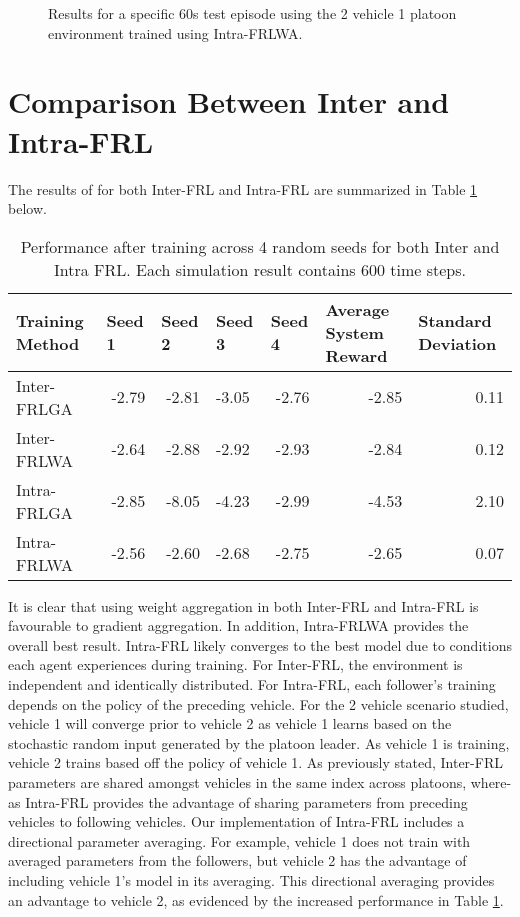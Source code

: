 \begin{figure}[H]
    \centering
    
    \caption{Results for a specific 60s test episode using the 2 vehicle 1 platoon environment trained using Intra-FRLWA.}
    \label{fig:intraFRL-simresult}
\end{figure}

\section{Comparison Between Inter and Intra-FRL}
The results of for both Inter-FRL and Intra-FRL are summarized in Table \ref{tab:inter_vs_intra} below.

\begin{table}[H]
    \centering
    \scriptsize
    \caption{Performance after training across 4 random seeds for both Inter and Intra FRL. Each simulation result contains 600 time steps.}
    \begin{tabular}{lrrlrrr} \toprule
    \textbf{Training Method} & \multicolumn{1}{l}{\textbf{Seed 1}} & \multicolumn{1}{l}{\textbf{Seed 2}} & \multicolumn{1}{l}{\textbf{Seed 3}} & \multicolumn{1}{l}{\textbf{Seed 4}} & \multicolumn{1}{l}{\textbf{Average System Reward}} & \multicolumn{1}{l}{\textbf{Standard Deviation}} \\ \midrule
        Inter-FRLGA & -2.79 & -2.81 & -3.05 & -2.76 & -2.85 & 0.11 \\
        Inter-FRLWA & -2.64 & -2.88 & -2.92 & -2.93 & -2.84 & 0.12 \\
        Intra-FRLGA & -2.85 & -8.05 & -4.23 & -2.99 & -4.53 & 2.10 \\
        Intra-FRLWA & -2.56 & -2.60 & -2.68 & -2.75 & -2.65 & 0.07 \\ \bottomrule
    \end{tabular}
    \label{tab:inter_vs_intra}
\end{table}

It is clear that using weight aggregation in both Inter-FRL and Intra-FRL is favourable to gradient aggregation.  In addition, Intra-FRLWA provides the overall best result.  Intra-FRL likely converges to the best model due to conditions each agent experiences during training.  For Inter-FRL, the environment is independent and identically distributed. For Intra-FRL, each follower's training depends on the policy of the preceding vehicle.  For the 2 vehicle scenario studied, vehicle 1 will converge prior to vehicle 2 as vehicle 1 learns based on the stochastic random input generated by the platoon leader. As vehicle 1 is training, vehicle 2 trains based off the policy of vehicle 1. As previously stated, Inter-FRL parameters are shared amongst vehicles in the same index across platoons, where-as Intra-FRL provides the advantage of sharing parameters from preceding vehicles to following vehicles. Our implementation of Intra-FRL includes a directional parameter averaging.  For example, vehicle 1 does not train with averaged parameters from the followers, but vehicle 2 has the advantage of including vehicle 1's model in its averaging.  This directional averaging provides an advantage to vehicle 2, as evidenced by the increased performance in Table \ref{tab:inter_vs_intra}.  

